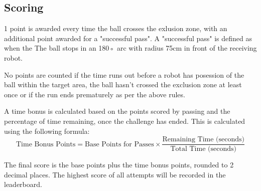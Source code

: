 \subsection{Scoring}
1 point is awarded every time the ball crosses the exlusion zone,
with an additional point awarded for a "successful pass". A "successful pass" is defined as when the
The ball stops in an 180◦ arc with radius 75cm in front of the receiving robot.

No points are counted if the time runs out before a robot has posession of the ball
within the target area, the ball hasn't crossed the exclusion zone at least once
or if the run ends prematurely as per the above rules.

A time bonus is calculated based on the points scored by passing and the percentage of time remaining, once the
challenge has ended. This is calculated using the following formula:
\[
\text{Time Bonus Points} = \text{Base Points for Passes} \times \frac{\text{Remaining Time (seconds)}}{\text{Total Time (seconds)}}
\]

The final score is the base points plus the time bonus points, rounded to 2 decimal places. The highest score of all attempts will be recorded in the leaderboard.

